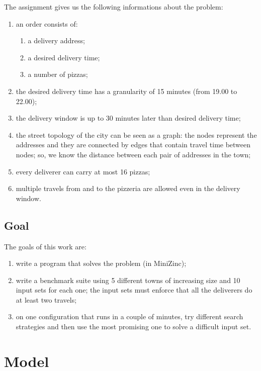 \documentclass[10pt]{article}
\begin{document}
	The assignment gives us the following informations about the problem:
	\begin{enumerate}
		\item an order consists of:
		\begin{enumerate}
			\item a delivery address;
			\item a desired delivery time;
			\item a number of pizzas;
		\end{enumerate}
		\item the desired delivery time has a granularity of 15 minutes (from 
			19.00 to 22.00);
		\item the delivery window is up to 30 minutes later than desired delivery 
			time;
		\item the street topology of the city can be seen as a graph: the nodes represent
			the addresses and they are connected by edges that contain travel time 
			between nodes; so, we know the distance between each pair of addresses
			in the town;
		\item every deliverer can carry at most 16 pizzas;
		\item multiple travels from and to the pizzeria are allowed even in the 
			delivery window.
	\end{enumerate}

	\subsection{Goal}

	The goals of this work are:
	\begin{enumerate}
		\item write a program that solves the problem (in MiniZinc);
		\item write a benchmark suite using 5 different towns of increasing size
			and 10 input sets for each one; the input sets must enforce that all
			the deliverers do at least two travels;
		\item on one configuration that runs in a couple of minutes, try
			different search strategies and then use the most promising one to solve a
			difficult input set.
	\end{enumerate}

	\section{Model}
	\label{Model}

	
\end{document}
